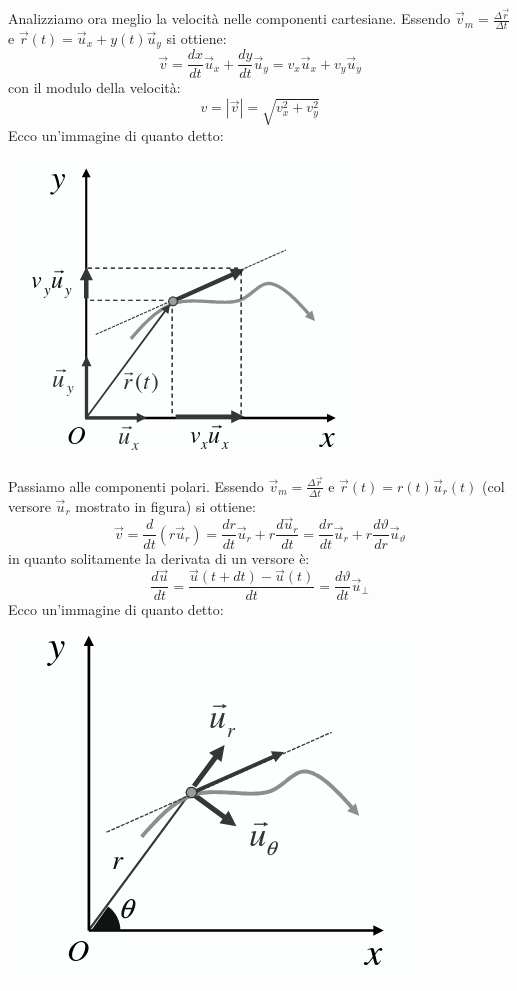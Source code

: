 \documentclass[a4paper,12pt, oneside]{book}
\begin{document}
Analizziamo ora meglio la velocità nelle componenti cartesiane. Essendo $\vec{v}_m=\frac{\Delta\vec{r}}{\Delta t}$ e $\vec{r}(t)=\vec{u}_x+y(t)\vec{u}_y$ si ottiene:
$$\vec{v}=\frac{dx}{dt}\vec{u}_x+\frac{dy}{dt}\vec{u}_y=v_x\vec{u}_x+v_y\vec{u}_y$$
con il modulo della velocità:
$$v=|\vec{v}|=\sqrt{v_x^2+v_y^2}$$
Ecco un'immagine di quanto detto:
\begin{center}
	\includegraphics[scale=0.6]{img/pia5.png}
\end{center}
Passiamo alle componenti polari. Essendo $\vec{v}_m=\frac{\Delta\vec{r}}{\Delta t}$ e $\vec{r}(t)=r(t)\vec{u}_r(t)$ (col versore $\vec{u}_r$ mostrato in figura) si ottiene:
$$\vec{v}=\frac{d}{dt}(r\vec{u}_r)=\frac{dr}{dt}\vec{u}_r+r\frac{d\vec{u}_r}{dt}=\frac{dr}{dt} \vec{u}_r+r\frac{d\vartheta}{dr}\vec{u}_\vartheta$$
in quanto solitamente la derivata di un versore è:
$$\frac{d\vec{u}}{dt}=\frac{\vec{u}(t+dt)-\vec{u}(t)}{dt}=\frac{d\vartheta}{dt}\vec{u}_\bot$$
Ecco un'immagine di quanto detto:
\begin{center}
	\includegraphics[scale=0.5]{img/pia6.png}
\end{center}
\end{document}

